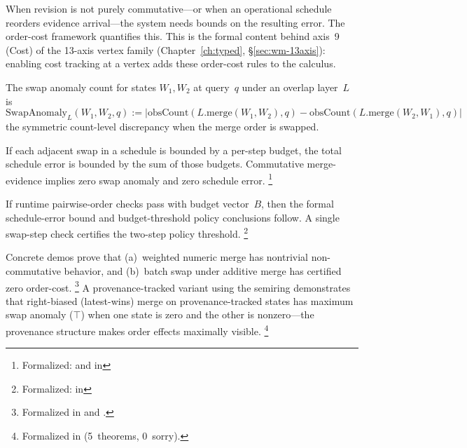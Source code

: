 \documentclass[11pt,openany]{report}
\begin{document}
When revision is not purely commutative---or when an operational
schedule reorders evidence arrival---the system needs bounds on the
resulting error.  The order-cost framework quantifies this.  This is
the formal content behind axis~9 (Cost) of the 13-axis vertex family
(Chapter~\ref{ch:typed}, \S\ref{sec:wm-13axis}): enabling cost
tracking at a vertex adds these order-cost rules to the calculus.

\begin{definition}
The swap anomaly count for states $W_1, W_2$ at query~$q$ under
an overlap layer~$L$ is
\[
  \mathrm{SwapAnomaly}_L(W_1, W_2, q) :=
  |\mathrm{obsCount}(L.\mathrm{merge}(W_1, W_2), q) -
   \mathrm{obsCount}(L.\mathrm{merge}(W_2, W_1), q)|
\]
the symmetric count-level discrepancy when the merge order is
swapped.
\end{definition}

\begin{theorem}
\label{thm:order-cost}
If each adjacent swap in a schedule is bounded by a per-step budget,
the total schedule error is bounded by the sum of those budgets.
Commutative merge-evidence implies zero swap anomaly and zero
schedule error.%
\footnote{Formalized:
 and
in 
}
\end{theorem}

\begin{theorem}
\label{thm:audit-cert}
If runtime pairwise-order checks pass with budget vector~$B$, then
the formal schedule-error bound and budget-threshold policy
conclusions follow.  A single swap-step check certifies the
two-step policy threshold.%
\footnote{Formalized:
in 
}
\end{theorem}

\noindent
Concrete demos prove that (a)~weighted numeric merge has nontrivial
non-commutative behavior, and (b)~batch swap under additive merge
has certified zero order-cost.%
\footnote{Formalized in
 and
.}
A provenance-tracked variant using the  semiring
demonstrates that right-biased (latest-wins) merge on
provenance-tracked states has maximum swap anomaly ($\top$)
when one state is zero and the other is nonzero---the
provenance structure makes order effects maximally visible.%
\footnote{Formalized in
(5~theorems, 0~sorry).}
\end{document}
